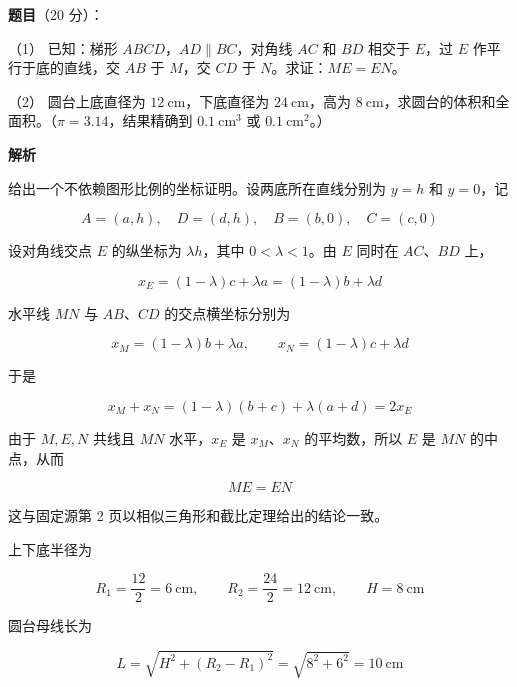 \begin{answer}

\textbf{题目}（20 分）：

（1） 已知：梯形 $ABCD$，$AD\parallel BC$，对角线 $AC$ 和 $BD$ 相交于 $E$，过 $E$ 作平行于底的直线，交 $AB$ 于 $M$，交 $CD$ 于 $N$。求证：$ME=EN$。
\nopagebreak[4]
\begin{center}\end{center}
\nopagebreak[4]
（2） 圆台上底直径为 $12\ \mathrm{cm}$，下底直径为 $24\ \mathrm{cm}$，高为 $8\ \mathrm{cm}$，求圆台的体积和全面积。（$\pi=3.14$，结果精确到 $0.1\ \mathrm{cm^3}$ 或 $0.1\ \mathrm{cm^2}$。）

\textbf{解析}


给出一个不依赖图形比例的坐标证明。设两底所在直线分别为 $y=h$ 和 $y=0$，记

\nopagebreak[4]
\[
A=(a,h),\quad D=(d,h),\quad B=(b,0),\quad C=(c,0)
\]

设对角线交点 $E$ 的纵坐标为 $\lambda h$，其中 $0<\lambda<1$。由 $E$ 同时在 $AC$、$BD$ 上，

\nopagebreak[4]
\[
x_E=(1-\lambda)c+\lambda a=(1-\lambda)b+\lambda d
\]

水平线 $MN$ 与 $AB$、$CD$ 的交点横坐标分别为

\nopagebreak[4]
\[
x_M=(1-\lambda)b+\lambda a,
\qquad
x_N=(1-\lambda)c+\lambda d
\]

于是

\nopagebreak[4]
\[
x_M+x_N=(1-\lambda)(b+c)+\lambda(a+d)=2x_E
\]

由于 $M,E,N$ 共线且 $MN$ 水平，$x_E$ 是 $x_M$、$x_N$ 的平均数，所以 $E$ 是 $MN$ 的中点，从而

\nopagebreak[4]
\[
ME=EN
\]

这与固定源第 2 页以相似三角形和截比定理给出的结论一致。


上下底半径为

\nopagebreak[4]
\[
R_1=\frac{12}{2}=6\ \mathrm{cm},
\qquad
R_2=\frac{24}{2}=12\ \mathrm{cm},
\qquad H=8\ \mathrm{cm}
\]

圆台母线长为

\nopagebreak[4]
\[
L=\sqrt{H^2+(R_2-R_1)^2}=\sqrt{8^2+6^2}=10\ \mathrm{cm}
\]


\end{answer}
